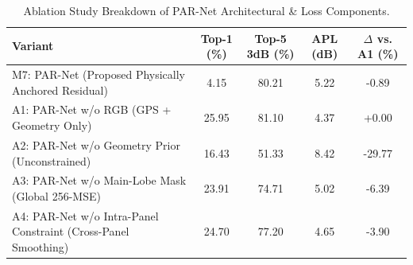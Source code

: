 \begin{table}[h]
\centering
\caption{Ablation Study Breakdown of PAR-Net Architectural & Loss Components.}
\label{tab:ablation_breakdown}
\begin{tabular}{lcccc}
\hline
Variant & Top-1 (\%) & Top-5 3dB (\%) & APL (dB) & $\Delta$ vs. A1 (\%) \\
\hline
M7: PAR-Net (Proposed Physically Anchored Residual) & 4.15 & 80.21 & 5.22 & -0.89 \\
A1: PAR-Net w/o RGB (GPS + Geometry Only) & 25.95 & 81.10 & 4.37 & +0.00 \\
A2: PAR-Net w/o Geometry Prior (Unconstrained) & 16.43 & 51.33 & 8.42 & -29.77 \\
A3: PAR-Net w/o Main-Lobe Mask (Global 256-MSE) & 23.91 & 74.71 & 5.02 & -6.39 \\
A4: PAR-Net w/o Intra-Panel Constraint (Cross-Panel Smoothing) & 24.70 & 77.20 & 4.65 & -3.90 \\
\hline
\end{tabular}
\end{table}
